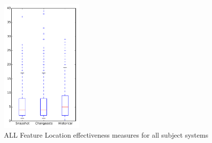 
\begin{figure}[t]
\centering
\includegraphics[width=0.36\textwidth]{figures/flt/all_overview}
\caption{ALL Feature Location effectiveness measures for all subject systems}
\label{fig:flt:all:overview}
\end{figure}
